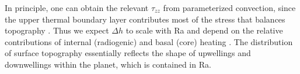 

In principle, one can obtain the relevant $\tau_{zz}$ from parameterized convection, since the upper thermal boundary layer contributes most of the stress that balances topography \citep{Parsons1983, Solomatov1995}. Thus we expect $\Delta h$ to scale with Ra and depend on the relative contributions of internal (radiogenic) and basal (core) heating \citep{McKenzie1977}. The distribution of surface topography essentially reflects the shape of upwellings and downwellings within the planet, which is contained in Ra. 



